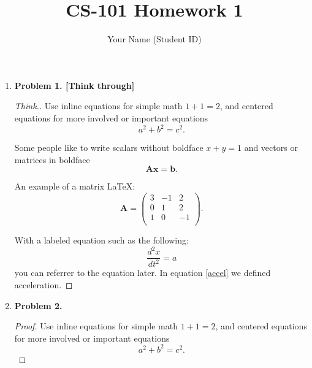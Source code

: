 \documentclass[11pt]{article}
\begin{document}
\author{Your Name (Student ID)}
\title{CS-101 Homework 1}
\maketitle

\medskip

\begin{enumerate}

\item
\textbf{Problem 1. [Think through]}

\begin{proof}[Think.]

Use inline equations for simple math $1+1=2$, and centered equations for more involved or important equations
\begin{equation}
    a^2 + b^2 = c^2.
\end{equation}

Some people like to write scalars without boldface $x+y=1$ and vectors or matrices in boldface
\begin{equation}
    \mathbf{A} \mathbf{x} = \mathbf{b}.
\end{equation}

An example of a matrix \LaTeX:
\begin{equation}
    \mathbf{A} = \left(
    \begin{array}{ccc}
    3 & -1 & 2 \\ 	
    0 & 1 & 2 \\ 
    1 & 0 & -1 \\
\end{array} 
\right).  
\end{equation}

With a labeled equation such as the following:
\begin{equation}
    \label{accel}
    \frac{d^2 x}{d t^2} = a
\end{equation}
you can referrer to the equation later. In equation \ref{accel} we defined acceleration.

\end{proof}

\item
\textbf{Problem 2.}

\begin{proof}

Use inline equations for simple math $1+1=2$, and centered equations for more involved or important equations
\begin{equation}
    a^2 + b^2 = c^2.
\end{equation}


\end{proof}
\end{enumerate}
\end{document}
